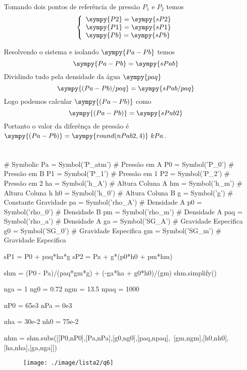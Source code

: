 \documentclass[a4paper,twocolumn,11pt]{article}
\newcommand{\npy}[1]{\sympy{round(n#1,4)}}
\newcommand{\epy}[1]{\sympy{#1} = \sympy{s#1}}
\begin{document}
Tomando dois pontos de referência de pressão $P_1$ e $P_2$ temos
$$
\left\{
\begin{array}{l}
\epy{P2}\\
\epy{P1}\\
\epy{Pb}\\
\end{array}
\right.
$$

Resolvendo o sistema e isolando $\sympy{Pa-Pb}$ temos
\begin{equation}
\sympy{Pa-Pb} = \sympy{sPab}
\end{equation}
Dividindo tudo pela densidade da água $\sympy{paq}$
$$
\sympy{(Pa-Pb)/paq} = \sympy{sPab/paq}
$$
Logo podemos calcular $\sympy{(Pa-Pb)}$ como 
\begin{equation}
\sympy{(Pa-Pb)} = \sympy{sPab2}
\end{equation}
Portanto o valor da diferênça de pressão é $\sympy{(Pa-Pb)} = \npy{Pab2}\ kPa$.

\section{} %
\begin{sympycode}
# Symbolic
Pa = Symbol('P_atm') # Pressão em A
P0 = Symbol('P_0') # Pressão em B
P1 = Symbol('P_1') # Pressão em 1
P2 = Symbol('P_2') # Pressão em 2
ha = Symbol('h_A') # Altura Coluna A
hm = Symbol('h_m') # Altura Coluna h
h0 = Symbol('h_0') # Altura Coluna B
g = Symbol('g') # Constante Gravidade
pa = Symbol('rho_A') # Densidade A
p0 = Symbol('rho_0') # Densidade B
pm = Symbol('rho_m') # Densidade A
paq = Symbol('rho_a') # Densidade A
ga = Symbol('SG_A') # Gravidade Especifica
g0 = Symbol('SG_0') # Gravidade Especifica
gm = Symbol('SG_m') # Gravidade Especifica

sP1 = P0 + paq*ha*g
sP2 = Pa + g*(p0*h0 + pm*hm)

shm  = (P0 - Pa)/(paq*gm*g) + (-ga*ha + g0*h0)/(gm)
shm.simplify()

nga = 1
ng0 = 0.72
ngm = 13.5
npaq = 1000

nP0 = 65e3
nPa = 0e3

nha = 30e-2
nh0 = 75e-2

nhm = shm.subs([[P0,nP0],[Pa,nPa],[g0,ng0],[paq,npaq],\
    [gm,ngm],[h0,nh0],[ha,nha],[ga,nga]])
\end{sympycode}


\begin{figure}[H]
\centering
\label{fig:l2q6}
\texttt{[image: ./image/lista2/q6]}
\caption{}
\end{figure}
\end{document}
